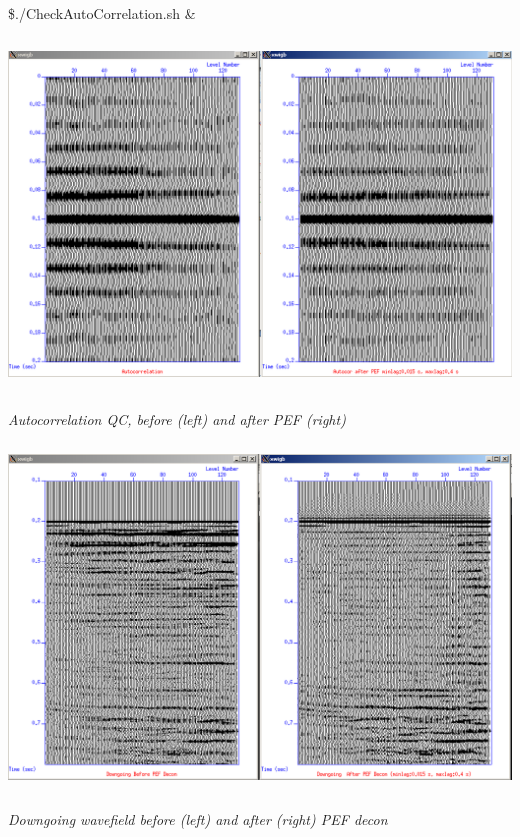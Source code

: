 \documentclass{article}
\begin{document}
\vspace{4pt}
\$./CheckAutoCorrelation.sh \&

\vspace{4pt}
\begin{center}
\includegraphics[width=409pt, height=265pt, keepaspectratio=true]{LatihanVSPsu-fig011.png}

\vspace{16pt}
\textit{Autocorrelation QC, before (left) and after PEF (right)}

\vspace{4pt}
\includegraphics[width=402pt, height=261pt, keepaspectratio=true]{LatihanVSPsu-fig012.png}

\vspace{16pt}
\textit{Downgoing wavefield before (left) and after (right) PEF decon\pagebreak{}}
\end{center}
\end{document}
